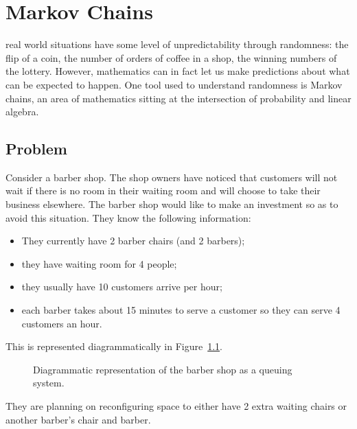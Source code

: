 \chapter[Markov Chains]{Markov Chains}\label{chp:markov_chains}

 real world situations have some level of
unpredictability through randomness: the flip of a coin, the number of orders of
coffee in a shop, the winning numbers of the lottery. However, mathematics can
in fact let us make predictions about what can be expected to happen. One tool used to
understand randomness is Markov chains, an area of mathematics sitting at the
intersection of probability and linear algebra.

\section{Problem}\label{sec:markov_chains_problem}

Consider a barber shop. The shop owners have noticed that customers will not
wait if there is no room in their waiting room and will choose to take their
business elsewhere. The barber shop would like to make an investment so as to
avoid this situation. They know the following information:

\begin{itemize}
    \item They currently have 2 barber chairs (and 2 barbers);
    \item they have waiting room for 4 people;
    \item they usually have 10 customers arrive per hour;
    \item each barber takes about 15 minutes to serve a customer so they can
        serve 4 customers an hour.
\end{itemize}

This is represented diagrammatically in Figure~\ref{fig:barber-shop}.

\begin{figure}[!hbtp]
    \begin{center}
    
    \end{center}
    \caption{Diagrammatic representation of the barber shop as a queuing system.}
    \label{fig:barber-shop}
\end{figure}


They are planning on
reconfiguring space to either have 2 extra waiting chairs or
another barber's chair and barber.

